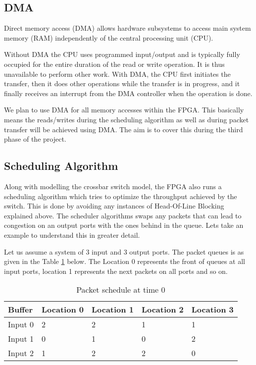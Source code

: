 \documentclass[twoside,12pt,fleqn]{book} %
\begin{document}
\subsection{DMA}
Direct memory access (DMA) allows hardware subsystems to access main system memory (RAM) independently of the central processing unit (CPU).
\par\vspace{\baselineskip}
Without DMA the CPU uses programmed input/output and is typically fully occupied for the entire duration of the read or write operation. It is thus unavailable to perform other work. With DMA, the CPU first initiates the transfer, then it does other operations while the transfer is in progress, and it finally receives an interrupt from the DMA controller when the operation is done.
\par\vspace{\baselineskip}
We plan to use DMA for all memory accesses within the FPGA. This basically means the reads/writes during the scheduling algorithm as well as during packet transfer will be achieved using DMA. The aim is to cover this during the third phase of the project.
\subsection{Scheduling Algorithm}
Along with modelling the crossbar switch model, the FPGA also runs a scheduling algorithm which tries to optimize the throughput achieved by the switch. This is done by avoiding any instances of Head-Of-Line Blocking explained above. The scheduler algorithms swaps any packets that can lead to congestion on an output ports with the ones behind in the queue. Lets take an example to understand this in greater detail.
\par\vspace{\baselineskip}
Let us assume a system of 3 input and 3 output ports. The packet queues is as given in the Table \ref{table:schedule_0} below. The Location 0 represents the front of queues at all input ports, location 1 represents the next packets on all ports and so on.
\begin{table}[h!]
\begin{center}
    \begin{tabular}{| l | l | l | l | l |}
    \hline
    Buffer & Location 0 & Location 1 & Location 2 & Location 3\\ \hline
    Input 0 & 2 & 2 & 1 & 1\\ \hline
    Input 1 & 0 & 1 & 0 & 2 \\ \hline
    Input 2 & 1 & 2 & 2 & 0\\ \hline
    \end{tabular}
    \caption{Packet schedule at time 0}
	\label{table:schedule_0}
\end{center}
\end{table}
\end{document}
